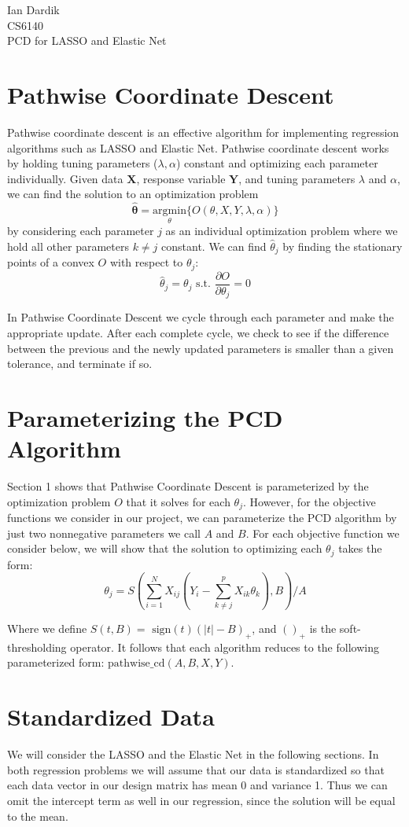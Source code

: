 \documentclass[12pt]{article}
\newcommand{\bY}{\mathbf{Y}}
\newcommand{\bX}{\mathbf{X}}
\newcommand{\thh}{\hat{\theta}}
\newcommand{\sgn}{\text{ sign}}
\begin{document}
Ian Dardik \\
CS6140 \\
PCD for LASSO and Elastic Net

\section{Pathwise Coordinate Descent}
Pathwise coordinate descent is an effective algorithm for implementing regression algorithms such as LASSO and Elastic Net\cite{ht}.  Pathwise coordinate descent works by holding tuning parameters ($\lambda, \alpha$) constant and optimizing each parameter individually\cite{ht}.  Given data $\bX$, response variable $\bY$, and tuning parameters $\lambda$ and $\alpha$, we can find the solution to an optimization problem
	$$\mathbf{\thh} = \underset{\theta}{\text{argmin}}\{O(\theta,X,Y,\lambda,\alpha)\}$$
by considering each parameter $j$ as an individual optimization problem where we hold all other parameters $k \ne j$ constant.  We can find $\thh_j$ by finding the stationary points of a convex $O$ with respect to $\theta_j$:
	$$\thh_j = \theta_j \text{ s.t. } \frac{\partial O}{\partial \theta_j} = 0$$

In Pathwise Coordinate Descent we cycle through each parameter and make the appropriate update.  After each complete cycle, we check to see if the difference between the previous and the newly updated parameters is smaller than a given tolerance, and terminate if so.  


\section{Parameterizing the PCD Algorithm}
Section 1 shows that Pathwise Coordinate Descent is parameterized by the optimization problem $O$ that it solves for each $\theta_j$.  However, for the objective functions we consider in our project, we can parameterize the PCD algorithm by just two nonnegative parameters we call $A$ and $B$.  For each objective function we consider below, we will show that the solution to optimizing each $\theta_j$ takes the form:
	$$\theta_j = S\left(\sum\limits_{i=1}^N X_{ij}(Y_i - \sum\limits_{k \ne j}^p X_{ik}\theta_k), B\right)/A$$

Where we define\cite{ht} $S(t,B) = \sgn(t)(|t|-B)_+$, and $()_+$ is the soft-thresholding operator.  It follows that each algorithm reduces to the following parameterized form: $\text{pathwise\_cd}(A, B, X, Y)$.  


\section{Standardized Data}
We will consider the LASSO and the Elastic Net in the following sections.  In both regression problems we will assume that our data is standardized so that each data vector in our design matrix has mean 0 and variance 1.  Thus we can omit the intercept term as well in our regression, since the solution will be equal to the mean\cite{ht}.  
\end{document}
